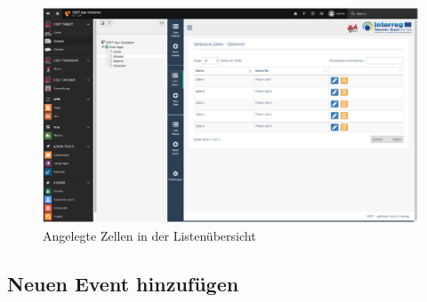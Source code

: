\begin{figure}[ht!]
\centering
\includegraphics[width=12cm]{Figures/paula/glossar/angelegte_zellen.png}
\caption{Angelegte Zellen in der Listenübersicht}
\label{img:angelegte_zellen}
\end{figure}

\subsection{Neuen Event hinzufügen}

